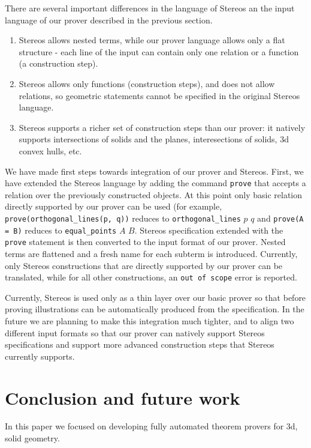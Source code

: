 \documentclass[final,1p,times,authoryear]{elsarticle}
\begin{document}
There are several important differences in the language of Stereos an
the input language of our prover described in the previous section. 
\begin{enumerate}
\item Stereos allows nested terms, while our prover language allows
  only a flat structure - each line of the input can contain only one
  relation or a function (a construction step).
\item Stereos allows only functions (construction steps), and does not
  allow relations, so geometric statements cannot be specified in the
  original Stereos language.
\item Stereos supports a richer set of construction steps than our
  prover: it natively supports intersections of solids and the planes,
  interesections of solids, 3d convex hulls, etc.
\end{enumerate}

We have made first steps towards integration of our prover and
Stereos. First, we have extended the Stereos language by adding the
command \texttt{prove} that accepts a relation over the previously
constructed objects. At this point only basic relation directly
supported by our prover can be used (for example,
\texttt{prove(orthogonal\_lines(p, q))} reduces to
\texttt{orthogonal\_lines} $p$ $q$ and \texttt{prove(A = B)} reduces
to \texttt{equal\_points} $A$ $B$. Stereos specification extended with
the \texttt{prove} statement is then converted to the input format of
our prover. Nested terms are flattened and a fresh name for each
subterm is introduced. Currently, only Stereos constructions that are
directly supported by our prover can be translated, while for all
other constructions, an \texttt{out of scope} error is reported.

Currently, Stereos is used only as a thin layer over our basic prover
so that before proving illustrations can be automatically produced
from the specification. In the future we are planning to make this
integration much tighter, and to align two different input formats so
that our prover can natively support Stereos specifications and
support more advanced construction steps that Stereos currently
supports.

\section{Conclusion and future work}

In this paper we focused on developing fully automated theorem provers
for 3d, solid geometry.
\end{document}
